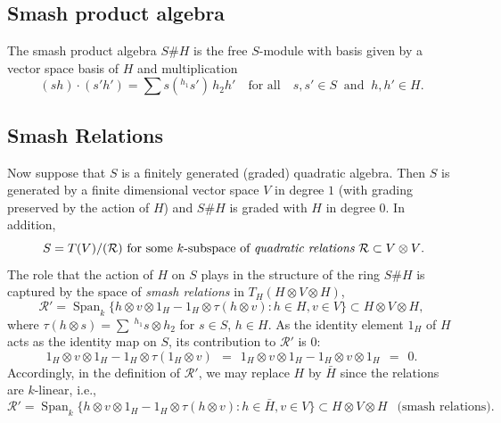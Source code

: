 \documentclass[11pt]{amsart}
\numberwithin{equation}{section}
\DeclareMathOperator{\Span}{Span}
\newcommand{\R}{\mathcal{R}}
\renewcommand{\_}[1]{\mbox{$_{\left( #1 \right)}$}}
\newcommand{\ot}{\otimes}
\newcommand{\Ho}{H}%
\begin{document}
{%
\subsection*{Smash product algebra}
The smash product algebra
$S\# \Ho$ is the free $S$-module with basis given by
a vector space basis of $\Ho$ 
and multiplication
\[
   (sh) \cdot (s'h') = \sum s ({}^{h_1}s')\, h_2 h'
   \quad\text{for all}\quad s,s' \in S\ \text{ and }\ h, h'\in H . 
 \]

 \vspace{1ex}
 
 \subsection*{Smash Relations}
 Now suppose that $S$ is a finitely generated (graded) quadratic algebra.
Then
$S$ is generated by a finite 
dimensional vector space $V$ in degree $1$
(with grading preserved by the action of $H$)
and $S\# H$ is graded with $H$ in degree $0$.
In addition,
\begin{equation}\label{quad-relns}
  \text{ $S = T(V)/(\R)$
for some $k$-subspace of {\em quadratic relations}
$\R\subset V\ot V$.}
\end{equation}
The role that the action of $H$ on $S$ plays in the structure of
the ring $S\# H$ is captured by the space of
{\em smash relations} in $T_H(H\ot V\ot H)$, 
\[
  \R'
  = \Span_k \{ h\ot v\ot 1_H - 1_H\ot \tau(h\ot v)  : 
   h\in \Ho, v\in V  \} \subset \Ho\ot V\ot \Ho  ,
    \]
where $\tau(h\ot s) = \sum \ ^{h_1}s\ot h_2$
for $s\in S$, $h\in \Ho$.
As the identity element $1_H$ of $H$ acts as
the identity map on $S$, its contribution to $\R'$ is 0:
\begin{equation}\label{TauOnScalars}
   1_H\ot  v\ot 1_H  - 1_H\ot \tau(1_H\ot v)  
  \ \ = \ \ 1_H\ot v\ot 1_H - 1_H \ot v\ot 1_H \ \ = \ \ 0 .
\end{equation}
Accordingly, in the definition of $\R'$, we may replace $H$
by $\bar H$ since
the relations are $k$-linear, i.e.,
\begin{equation}\label{smash-relns}
   \R' = \Span_k \{ h\ot v\ot 1_H - 1_H\ot \tau(h\ot v)  : 
   h\in \bar{\Ho}, v\in V  \} \subset \Ho\ot V\ot \Ho 
   \ \ \text{ (smash relations)} . 
 \end{equation}

 \vspace{1ex}

}
\end{document}
